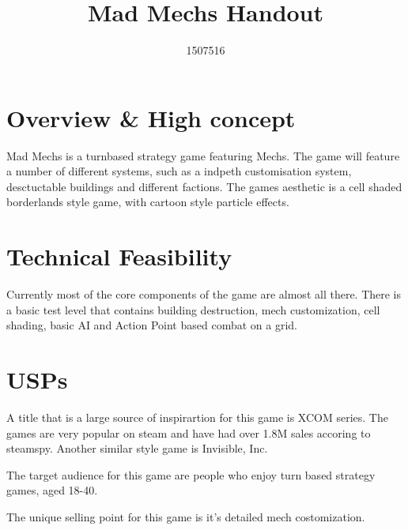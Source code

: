 \documentclass{tufte-handout}
\title{Mad Mechs Handout}
\author{1507516}
\begin{document}
\maketitle


\section{Overview \& High concept}
Mad Mechs is a turnbased strategy game featuring Mechs.
The game will feature a number of different systems, such as a indpeth customisation system, desctuctable buildings and
different factions.
The games aesthetic is a cell shaded borderlands style game, with cartoon style particle effects.


\section{Technical Feasibility}
Currently most of the core components of the game are almost
all there. There is a basic test level that contains building
destruction, mech customization, cell shading, basic AI and 
Action Point based combat on a grid.


\section{USPs}
A title that is a large source of inspirartion for this 
game is XCOM series. The games are very popular on steam
and have had over 1.8M sales accoring to steamspy.
Another similar style game is Invisible, Inc.

The target audience for this game are people who enjoy
turn based strategy games, aged 18-40.

The unique selling point for this game is it’s detailed 
mech costomization.
\end{document}
